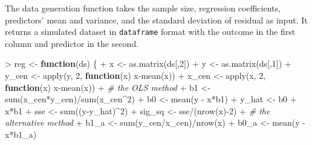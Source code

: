 \documentclass[
]{article}
\newenvironment{Shaded}{\begin{snugshade}}{\end{snugshade}}
\newcommand{\CommentTok}[1]{\textcolor[rgb]{0.56,0.35,0.01}{\textit{#1}}}
\newcommand{\ControlFlowTok}[1]{\textcolor[rgb]{0.13,0.29,0.53}{\textbf{#1}}}
\newcommand{\DecValTok}[1]{\textcolor[rgb]{0.00,0.00,0.81}{#1}}
\newcommand{\FunctionTok}[1]{\textcolor[rgb]{0.00,0.00,0.00}{#1}}
\newcommand{\NormalTok}[1]{#1}
\newcommand{\OtherTok}[1]{\textcolor[rgb]{0.56,0.35,0.01}{#1}}
\newcommand{\SpecialCharTok}[1]{\textcolor[rgb]{0.00,0.00,0.00}{#1}}
\begin{document}
The data generation function takes the sample size, regression
coefficients, predictors' mean and variance, and the standard deviation
of residual as input. It returns a simulated dataset in
\texttt{dataframe} format with the outcome in the first column and
predictor in the second.

\begin{Shaded}
\begin{Highlighting}[]
\SpecialCharTok{\textgreater{}}\NormalTok{ reg }\OtherTok{\textless{}{-}} \ControlFlowTok{function}\NormalTok{(ds) \{}
\SpecialCharTok{+}\NormalTok{   x }\OtherTok{\textless{}{-}} \FunctionTok{as.matrix}\NormalTok{(ds[,}\DecValTok{2}\NormalTok{])}
\SpecialCharTok{+}\NormalTok{   y }\OtherTok{\textless{}{-}} \FunctionTok{as.matrix}\NormalTok{(ds[,}\DecValTok{1}\NormalTok{])}
\SpecialCharTok{+}\NormalTok{   y\_cen }\OtherTok{\textless{}{-}} \FunctionTok{apply}\NormalTok{(y, }\DecValTok{2}\NormalTok{, }\ControlFlowTok{function}\NormalTok{(x) x}\SpecialCharTok{{-}}\FunctionTok{mean}\NormalTok{(x))}
\SpecialCharTok{+}\NormalTok{   x\_cen }\OtherTok{\textless{}{-}} \FunctionTok{apply}\NormalTok{(x, }\DecValTok{2}\NormalTok{, }\ControlFlowTok{function}\NormalTok{(x) x}\SpecialCharTok{{-}}\FunctionTok{mean}\NormalTok{(x))}
\SpecialCharTok{+}   \CommentTok{\# the OLS method}
\SpecialCharTok{+}\NormalTok{   b1 }\OtherTok{\textless{}{-}} \FunctionTok{sum}\NormalTok{(x\_cen}\SpecialCharTok{*}\NormalTok{y\_cen)}\SpecialCharTok{/}\FunctionTok{sum}\NormalTok{(x\_cen}\SpecialCharTok{\^{}}\DecValTok{2}\NormalTok{)}
\SpecialCharTok{+}\NormalTok{   b0 }\OtherTok{\textless{}{-}} \FunctionTok{mean}\NormalTok{(y }\SpecialCharTok{{-}}\NormalTok{ x}\SpecialCharTok{*}\NormalTok{b1)}
\SpecialCharTok{+}\NormalTok{   y\_hat }\OtherTok{\textless{}{-}}\NormalTok{ b0 }\SpecialCharTok{+}\NormalTok{ x}\SpecialCharTok{*}\NormalTok{b1}
\SpecialCharTok{+}\NormalTok{   sse }\OtherTok{\textless{}{-}} \FunctionTok{sum}\NormalTok{((y}\SpecialCharTok{{-}}\NormalTok{y\_hat)}\SpecialCharTok{\^{}}\DecValTok{2}\NormalTok{)}
\SpecialCharTok{+}\NormalTok{   sig\_sq }\OtherTok{\textless{}{-}}\NormalTok{ sse}\SpecialCharTok{/}\NormalTok{(}\FunctionTok{nrow}\NormalTok{(x)}\SpecialCharTok{{-}}\DecValTok{2}\NormalTok{)}
\SpecialCharTok{+}   \CommentTok{\# the alternative method}
\SpecialCharTok{+}\NormalTok{   b1\_a }\OtherTok{\textless{}{-}} \FunctionTok{sum}\NormalTok{(y\_cen}\SpecialCharTok{/}\NormalTok{x\_cen)}\SpecialCharTok{/}\FunctionTok{nrow}\NormalTok{(x)}
\SpecialCharTok{+}\NormalTok{   b0\_a }\OtherTok{\textless{}{-}} \FunctionTok{mean}\NormalTok{(y }\SpecialCharTok{{-}}\NormalTok{ x}\SpecialCharTok{*}\NormalTok{b1\_a)}

\end{Highlighting}
\end{Shaded}
\end{document}
